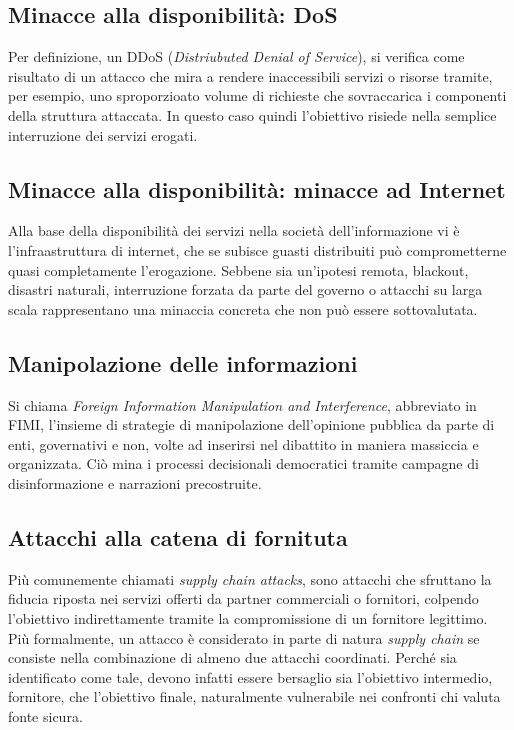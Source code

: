 \documentclass[12pt,a4paper,openright,twoside]{report}
\begin{document}
\subsection{Minacce alla disponibilit\`a: DoS}
Per definizione, un DDoS (\textit{Distriubuted Denial of Service}), si verifica come risultato di un attacco che mira a rendere inaccessibili servizi o risorse tramite, per esempio, uno sproporzioato volume di richieste che sovraccarica i componenti della struttura attaccata.
In questo caso quindi l'obiettivo risiede nella semplice interruzione dei servizi erogati.\\

\subsection{Minacce alla disponibilit\`a: minacce ad Internet}
Alla base della disponibilit\`a dei servizi nella societ\`a dell'informazione vi \`e l'infraastruttura di internet, che se subisce guasti distribuiti pu\`o comprometterne quasi completamente l'erogazione. Sebbene sia un'ipotesi remota,  blackout, disastri naturali, interruzione forzata da parte del governo o attacchi su larga scala rappresentano una minaccia concreta che non pu\`o essere sottovalutata.\\

\subsection{Manipolazione delle informazioni}
Si chiama \textit{Foreign Information Manipulation and Interference}, abbreviato in FIMI, l'insieme di strategie di manipolazione dell'opinione pubblica da parte di enti, governativi e non, volte ad inserirsi nel dibattito in maniera massiccia e organizzata. Ci\`o mina i processi decisionali democratici tramite campagne di disinformazione e narrazioni precostruite.\\
\subsection{Attacchi alla catena di fornituta}
Pi\`u comunemente  chiamati \textit{supply chain attacks}, sono attacchi che sfruttano la fiducia riposta nei servizi offerti da partner commerciali o fornitori, colpendo l'obiettivo indirettamente tramite la compromissione di un fornitore legittimo.\\
Pi\`u formalmente, un attacco \`e considerato in parte di natura \textit{supply chain} se consiste nella combinazione di almeno due attacchi coordinati. Perch\'e sia identificato come tale, devono infatti essere bersaglio sia l'obiettivo intermedio, fornitore, che l'obiettivo finale, naturalmente vulnerabile nei confronti chi valuta fonte sicura. \\
\end{document}
